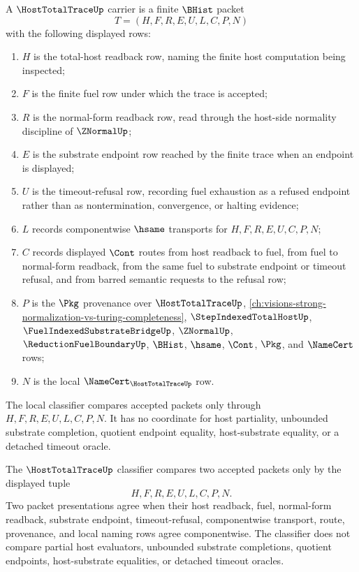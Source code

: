 \begin{definition}
\label{def:host-total-trace-carrier}
A $\HostTotalTraceUp$ carrier is a finite $\BHist$ packet
$$
T=(H,F,R,E,U,L,C,P,N)
$$
with the following displayed rows:
\begin{enumerate}
\item $H$ is the total-host readback row, naming the finite host computation being inspected;
\item $F$ is the finite fuel row under which the trace is accepted;
\item $R$ is the normal-form readback row, read through the host-side normality discipline of $\ZNormalUp$;
\item $E$ is the substrate endpoint row reached by the finite trace when an endpoint is displayed;
\item $U$ is the timeout-refusal row, recording fuel exhaustion as a refused endpoint rather than as nontermination, convergence, or halting evidence;
\item $L$ records componentwise $\hsame$ transports for $H,F,R,E,U,C,P,N$;
\item $C$ records displayed $\Cont$ routes from host readback to fuel, from fuel to normal-form readback, from the same fuel to substrate endpoint or timeout refusal, and from barred semantic requests to the refusal row;
\item $P$ is the $\Pkg$ provenance over $\HostTotalTraceUp$, \autoref{ch:visions-strong-normalization-vs-turing-completeness}, $\StepIndexedTotalHostUp$, $\FuelIndexedSubstrateBridgeUp$, $\ZNormalUp$, $\ReductionFuelBoundaryUp$, $\BHist$, $\hsame$, $\Cont$, $\Pkg$, and $\NameCert$ rows;
\item $N$ is the local $\NameCert_{\HostTotalTraceUp}$ row.
\end{enumerate}
The local classifier compares accepted packets only through $H,F,R,E,U,L,C,P,N$. It has no coordinate for host partiality, unbounded substrate completion, quotient endpoint equality, host-substrate equality, or a detached timeout oracle.
\end{definition}

\begin{definition}
\label{def:host-total-trace-classifier}
The $\HostTotalTraceUp$ classifier compares two accepted packets only by the displayed tuple
$$
H,F,R,E,U,L,C,P,N.
$$
Two packet presentations agree when their host readback, fuel, normal-form readback, substrate endpoint, timeout-refusal, componentwise transport, route, provenance, and local naming rows agree componentwise. The classifier does not compare partial host evaluators, unbounded substrate completions, quotient endpoints, host-substrate equalities, or detached timeout oracles.
\end{definition}

